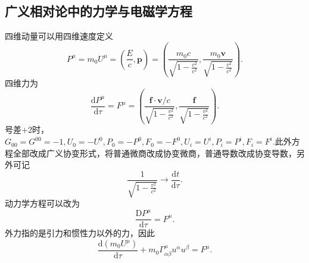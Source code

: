\documentclass[11pt, a4paper, oneside, onecolumn]{ctexart}
\numberwithin{equation}{subsection}
\begin{document}
\subsection{广义相对论中的力学与电磁学方程}
四维动量可以用四维速度定义
\begin{equation}
P^{\mu}=m_{0}U^{\mu}=\left(\frac{E}{c},\boldsymbol{p}\right)=\left(\frac{m_{0}c}{\sqrt{1-\frac{v^{2}}{c^{2}}}},\frac{m_{0}\boldsymbol{v}}{\sqrt{1-\frac{v^{2}}{c^{2}}}}\right).
\end{equation}
四维力为
\begin{equation}
\frac{\mathrm{d}P^{\mu}}{\mathrm{d}\tau}=F^{\mu}=\left(\frac{\boldsymbol{f}\cdot\boldsymbol{v}/c}{\sqrt{1-\frac{v^{2}}{c^{2}}}},\frac{\boldsymbol{f}}{\sqrt{1-\frac{v^{2}}{c^{2}}}}\right).
\end{equation}
号差+2时，$G_{00}=G^{00}=-1,U_{0}=-U^{0},P_{0}=-P^{0},F_{0}=-F^{0},U_{i}=U^{i},P_{i}=P^{i},F_{i}=F^{i}$.此外方程全部改成广义协变形式，将普通微商改成协变微商，普通导数改成协变导数，另外可记
\begin{equation}
\frac{1}{\sqrt{1-\frac{v^{2}}{c^{2}}}}\to\frac{\mathrm{d}t}{\mathrm{d}\tau}.
\end{equation}
动力学方程可以改为
\begin{equation}
\frac{\mathrm{D}P^{\mu}}{\mathrm{d}\tau}=F^{\mu}.
\end{equation}
外力指的是引力和惯性力以外的力，因此
\begin{equation}
\frac{\mathrm{d}\left(m_{0}U^{\mu}\right)}{\mathrm{d}\tau}+m_{0}\Gamma_{\alpha\beta}^{\mu}u^{\alpha}u^{\beta}=F^{\mu}.
\end{equation}
\end{document}
